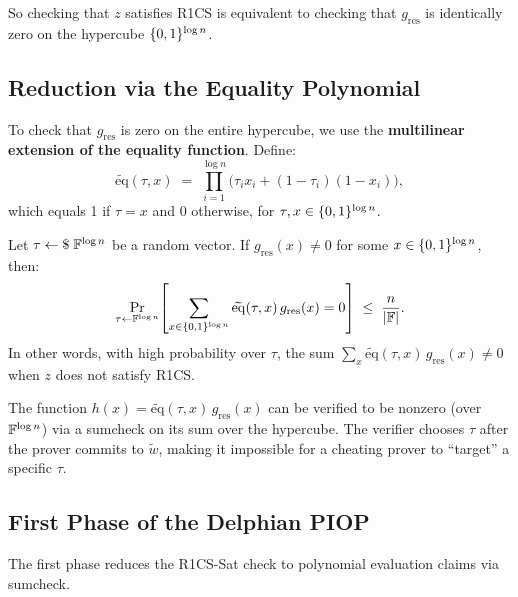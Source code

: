 \documentclass[11pt]{article}
\begin{document}
So checking that $z$ satisfies R1CS is equivalent to checking that
$g_{\mathrm{res}}$ is identically zero on the hypercube $\{0,1\}^{\log n}$.

\subsection{Reduction via the Equality Polynomial}

To check that $g_{\mathrm{res}}$ is zero on the entire hypercube, we use the
\textbf{multilinear extension of the equality function}. Define:
\[
  \widetilde{\mathrm{eq}}(\tau, x) \;=\; \prod_{i=1}^{\log n}
    \bigl(\tau_i x_i + (1 - \tau_i)(1 - x_i)\bigr),
\]
which equals 1 if $\tau = x$ and 0 otherwise, for $\tau, x \in \{0,1\}^{\log n}$.

\begin{theorem}
  Let $\tau \leftarrow \$\; \mathbb{F}^{\log n}$ be a random vector. If
  $g_{\mathrm{res}}(x) \neq 0$ for some $x \in \{0,1\}^{\log n}$, then:
  \[
    \Pr_{\tau \leftarrow \mathbb{F}^{\log n}}\!\left[
      \sum_{x \in \{0,1\}^{\log n}} \widetilde{\mathrm{eq}}(\tau, x)\, g_{\mathrm{res}}(x) = 0
    \right] \;\leq\; \frac{n}{|\mathbb{F}|}.
  \]
  In other words, with high probability over $\tau$, the sum
  $\sum_x \widetilde{\mathrm{eq}}(\tau, x)\, g_{\mathrm{res}}(x) \neq 0$ when
  $z$ does not satisfy R1CS.
\end{theorem}

\begin{remark}
  The function $h(x) = \widetilde{\mathrm{eq}}(\tau, x)\, g_{\mathrm{res}}(x)$
  can be verified to be nonzero (over $\mathbb{F}^{\log n}$) via a sumcheck on its sum
  over the hypercube. The verifier chooses $\tau$ after the prover commits to
  $\tilde{w}$, making it impossible for a cheating prover to ``target'' a specific
  $\tau$.
\end{remark}

\subsection{First Phase of the Delphian PIOP}

The first phase reduces the R1CS-Sat check to polynomial evaluation claims via
sumcheck.
\end{document}
